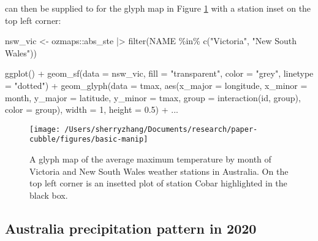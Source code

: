 \documentclass{article}
\newenvironment{Shaded}{\begin{snugshade}}{\end{snugshade}}
\newcommand{\AttributeTok}[1]{\textcolor[rgb]{0.77,0.63,0.00}{#1}}
\newcommand{\DecValTok}[1]{\textcolor[rgb]{0.00,0.00,0.81}{#1}}
\newcommand{\FloatTok}[1]{\textcolor[rgb]{0.00,0.00,0.81}{#1}}
\newcommand{\FunctionTok}[1]{\textcolor[rgb]{0.00,0.00,0.00}{#1}}
\newcommand{\NormalTok}[1]{#1}
\newcommand{\OtherTok}[1]{\textcolor[rgb]{0.56,0.35,0.01}{#1}}
\newcommand{\SpecialCharTok}[1]{\textcolor[rgb]{0.00,0.00,0.00}{#1}}
\newcommand{\StringTok}[1]{\textcolor[rgb]{0.31,0.60,0.02}{#1}}
\begin{document}
 can then be supplied to  for the glyph map in Figure \ref{fig:basic-manip} with a station inset on the top left corner:

\begin{Shaded}
\begin{Highlighting}[]
\NormalTok{nsw\_vic }\OtherTok{\textless{}{-}}\NormalTok{ ozmaps}\SpecialCharTok{::}\NormalTok{abs\_ste }\SpecialCharTok{|\textgreater{}}
  \FunctionTok{filter}\NormalTok{(NAME }\SpecialCharTok{\%in\%} \FunctionTok{c}\NormalTok{(}\StringTok{"Victoria"}\NormalTok{, }\StringTok{"New South Wales"}\NormalTok{))}

\FunctionTok{ggplot}\NormalTok{() }\SpecialCharTok{+}
  \FunctionTok{geom\_sf}\NormalTok{(}\AttributeTok{data =}\NormalTok{ nsw\_vic,}
          \AttributeTok{fill =} \StringTok{"transparent"}\NormalTok{, }\AttributeTok{color =} \StringTok{"grey"}\NormalTok{, }\AttributeTok{linetype =} \StringTok{"dotted"}\NormalTok{) }\SpecialCharTok{+}
  \FunctionTok{geom\_glyph}\NormalTok{(}\AttributeTok{data =}\NormalTok{ tmax,}
             \FunctionTok{aes}\NormalTok{(}\AttributeTok{x\_major =}\NormalTok{ longitude, }\AttributeTok{x\_minor =}\NormalTok{ month,}
                 \AttributeTok{y\_major =}\NormalTok{ latitude, }\AttributeTok{y\_minor =}\NormalTok{ tmax,}
                 \AttributeTok{group =} \FunctionTok{interaction}\NormalTok{(id, group), }\AttributeTok{color =}\NormalTok{ group),}
             \AttributeTok{width =} \DecValTok{1}\NormalTok{, }\AttributeTok{height =} \FloatTok{0.5}\NormalTok{) }\SpecialCharTok{+}
\NormalTok{  ...}
\end{Highlighting}
\end{Shaded}

\begin{figure}
\texttt{[image: /Users/sherryzhang/Documents/research/paper-cubble/figures/basic-manip]} \caption{A glyph map of the average maximum temperature by month of Victoria and New South Wales weather stations in Australia. On the top left corner is an insetted plot of station Cobar highlighted in the black box.}\label{fig:basic-manip}
\end{figure}

\hypertarget{australia-precipitation-pattern-in-2020}{%
\subsection{Australia precipitation pattern in 2020}\label{australia-precipitation-pattern-in-2020}}
\end{document}
